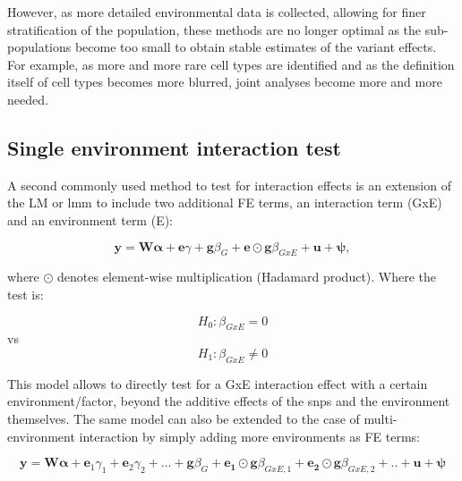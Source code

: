 However, as more detailed environmental data is collected, allowing for finer stratification of the population, these methods are no longer optimal as the sub-populations become too small to obtain stable estimates of the variant effects.
For example, as more and more rare cell types are identified and as the definition itself of cell types becomes more blurred, joint analyses become more and more needed.


\subsection{Single environment interaction test}

A second commonly used method to test for interaction effects is an extension of the LM or \gls{lmm} to include two additional FE terms, an interaction term (GxE) and an environment term (E):

\begin{equation}\label{eq:Interaction_test_FE_LMM}
 \mathbf{y} =  \mathbf{W}\boldsymbol{\alpha} + \mathbf{e}\gamma  + \mathbf{g}\beta_G + \mathbf{e}\odot\mathbf{g}\beta_{GxE} + \mathbf{u} + \boldsymbol{\psi}, 
\end{equation}

where $\odot$ denotes element-wise multiplication (Hadamard product).
Where the test is:

\begin{equation}
 H_{0}: \beta_{GxE}=0 
\end{equation}
vs
\begin{equation}
 H_{1}: \beta_{GxE} \neq 0 
\end{equation}

This model allows to directly test for a GxE interaction effect with a certain environment/factor, beyond the additive effects of the \gls{snp}s and the environment themselves. 
The same model can also be extended to the case of multi-environment interaction by simply adding more environments as FE terms:

\begin{equation}\label{eq:multi_interaction_test_FE_LMM}
 \mathbf{y} =  \mathbf{W}\boldsymbol{\alpha} + \mathbf{e}_1\gamma_1 + \mathbf{e}_2\gamma_2 + ...  + \mathbf{g}\beta_G + \mathbf{e_1}\odot\mathbf{g}\beta_{GxE,1}+ \mathbf{e_2}\odot\mathbf{g}\beta_{GxE,2} + .. + \mathbf{u} + \boldsymbol{\psi} 
\end{equation}


